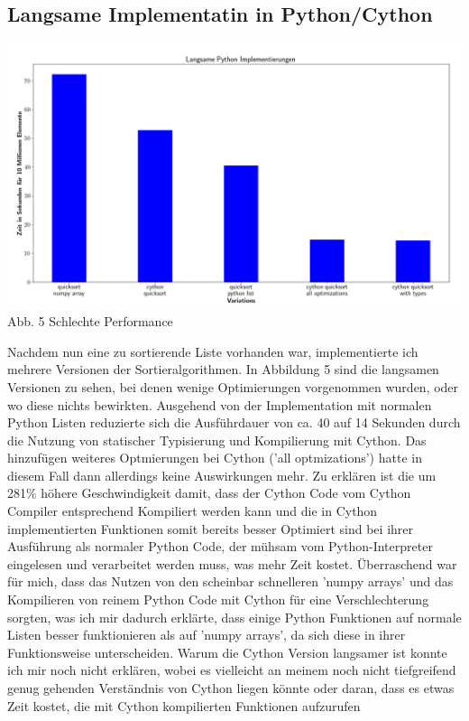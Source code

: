 \documentclass[12pt,a4paper]{article}
\begin{document}
\subsection{Langsame Implementatin in Python/Cython}

\begin{center}
    \hspace*{-1.5cm}\includegraphics[width=1.2\textwidth]{./diagramme/matplotlib/pythonlangsam.png}
    Abb. 5 Schlechte Performance
\end{center}

Nachdem nun eine zu sortierende Liste vorhanden war, implementierte ich mehrere Versionen der Sortieralgorithmen.
In Abbildung 5 sind die langsamen Versionen zu sehen, bei denen wenige Optimierungen vorgenommen wurden, oder wo diese nichts bewirkten.
Ausgehend von der Implementation mit normalen Python Listen reduzierte sich die Ausführdauer von ca. 40 auf 14 Sekunden
durch die Nutzung von statischer Typisierung und Kompilierung mit Cython. Das hinzufügen weiteres Optmierungen
bei Cython ('all optmizations') hatte in diesem Fall dann allerdings keine Auswirkungen mehr.
Zu erklären ist die um 281\% höhere Geschwindigkeit damit, dass der Cython Code vom Cython Compiler
entsprechend Kompiliert werden kann und die in Cython implementierten Funktionen somit bereits besser
Optimiert sind bei ihrer Ausführung als normaler Python Code, der mühsam vom Python-Interpreter eingelesen
und verarbeitet werden muss, was mehr Zeit kostet.
Überraschend war für mich, dass das Nutzen von den scheinbar schnelleren 'numpy arrays' und das Kompilieren
von reinem Python Code mit Cython für eine Verschlechterung sorgten, was ich mir dadurch erklärte, dass einige
Python Funktionen auf normale Listen besser funktionieren als auf 'numpy arrays', da sich diese in ihrer Funktionsweise
unterscheiden. Warum die Cython Version langsamer ist konnte ich mir noch nicht erklären, wobei es vielleicht an meinem
noch nicht tiefgreifend genug gehenden Verständnis von Cython liegen könnte oder daran, dass es etwas Zeit kostet,
die mit Cython kompilierten Funktionen aufzurufen
\end{document}
